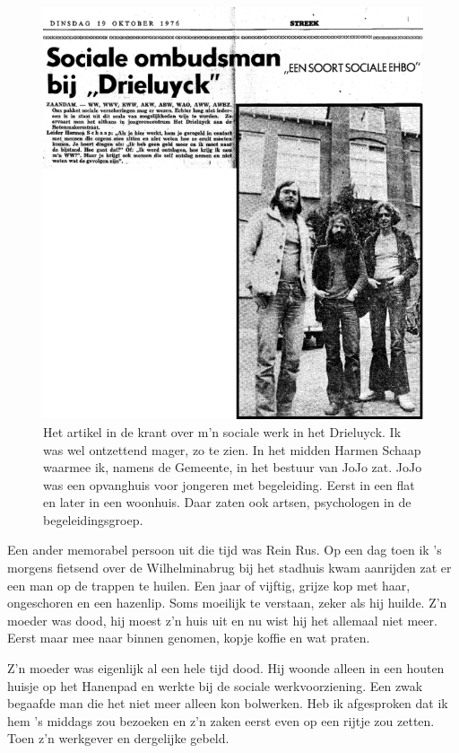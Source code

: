 \documentclass[12pt,twoside, openright]{memoir}
\begin{document}
\begin{figure}
\centering
\includegraphics[width=\textwidth]{img/ch42/krant}
\caption*{\footnotesize Het artikel in de krant over m'n sociale werk in het Drieluyck. Ik was wel ontzettend mager, zo te zien. In het midden Harmen Schaap waarmee ik, namens de Gemeente, in het bestuur van JoJo zat. JoJo was een opvanghuis voor jongeren met begeleiding. Eerst in een flat en later in een woonhuis. Daar zaten ook artsen, psychologen in de begeleidingsgroep. }
\end{figure}

Een ander memorabel persoon uit die tijd was Rein Rus. Op een dag toen ik ’s morgens fietsend over de Wilhelminabrug bij het stadhuis kwam aanrijden zat er een man op de trappen te huilen. Een jaar of vijftig, grijze kop met haar, ongeschoren en een hazenlip. Soms moeilijk te verstaan, zeker als hij huilde. Z’n moeder was dood, hij moest z’n huis uit en nu wist hij het allemaal niet meer. Eerst maar mee naar binnen genomen, kopje koffie en wat praten. 

Z’n moeder was eigenlijk al een hele tijd dood. Hij woonde alleen in een houten huisje op het Hanenpad en werkte bij de sociale werkvoorziening. Een zwak begaafde man die het niet meer alleen kon bolwerken. Heb ik afgesproken dat ik hem ’s middags zou bezoeken en z’n zaken eerst even op een rijtje zou zetten. Toen z'n werkgever en dergelijke gebeld. 
\end{document}
